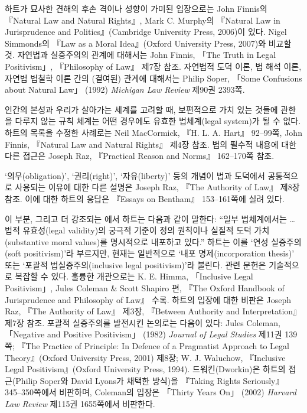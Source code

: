 {
하트가 묘사한 견해의 후손 격이나  성향이
가미된 입장으로는 John Finnis의 『Natural Law and Natural Rights』, Mark
C. Murphy의 『Natural Law in Jurisprudence and Politics』(Cambridge
University Press, 2006)이 있다. Nigel Simmonds의 『Law as a Moral
Idea』(Oxford University Press, 2007)와 비교할 것. 자연법과 실증주의의
관계에 대해서는 John Finnis, 「The Truth in Legal Positivism」,
『Philosophy of Law』 제7장 참조. 자연법적 도덕 이론, 법 해석 이론,
자연법 법철학 이론 간의 (결여된) 관계에 대해서는 Philip Soper, 「Some
Confusions about Natural Law」 (1992) \emph{Michigan Law Review} 제90권
2393쪽.

인간의 본성과 우리가 살아가는 세계를 고려할 때, 보편적으로 가치 있는
것들에 관한 을 다루지 않는 규칙
체계는 어떤 경우에도 유효한 법체계(legal system)가 될 수 없다. 하트의
목록을 수정한 사례로는 Neil MacCormick, 『H. L. A. Hart』 92--99쪽, John
Finnis, 『Natural Law and Natural Rights』 제4장 참조. 법의 필수적
내용에 대한 다른 접근은 Joseph Raz, 『Practical Reason and Norms』
162--170쪽 참조.

 `의무(obligation)', `권리(right)', `자유(liberty)' 등의
개념이 법과 도덕에서 공통적으로 사용되는 이유에 대한 다른 설명은 Joseph
Raz, 『The Authority of Law』 제8장 참조. 이에 대한 하트의 응답은
『Essays on Bentham』 153--161쪽에 실려 있다.

이 부분, 그리고 더 강조되는 에서 하트는 다음과
같이 말한다: ``일부 법체계에서는 \ldots{} 법적 유효성(legal validity)의
궁극적 기준이 정의 원칙이나 실질적 도덕 가치(substantive moral values)를
명시적으로 내포하고 있다.'' 하트는 이를 `연성 실증주의(soft
positivism)'라 부르지만, 현재는 일반적으로 `내포 명제(incorporation
thesis)' 또는 `포괄적 법실증주의(inclusive legal positivism)'라 불린다.
관련 문헌은 기술적으로 복잡할 수 있다. 훌륭한 개관으로는 K. E. Himma,
「Inclusive Legal Positivism」, Jules Coleman \& Scott Shapiro 편, 『The
Oxford Handbook of Jurisprudence and Philosophy of Law』 수록. 하트의
입장에 대한 비판은 Joseph Raz, 『The Authority of Law』 제3장, 『Between
Authority and Interpretation』 제7장 참조. 포괄적 실증주의를 발전시킨
논의로는 다음이 있다: Jules Coleman, 「Negative and Positive
Positivism」 (1982) \emph{Journal of Legal Studies} 제11권 139쪽; 『The
Practice of Principle: In Defence of a Pragmatist Approach to Legal
Theory』(Oxford University Press, 2001) 제8장; W. J. Waluchow,
『Inclusive Legal Positivism』(Oxford University Press, 1994).
드워킨(Dworkin)은 하트의 접근(Philip Soper와 David Lyons가 채택한
방식)을 『Taking Rights Seriously』 345--350쪽에서 비판하며, Coleman의
입장은 「Thirty Years On」 (2002) \emph{Harvard Law Review} 제115권
1655쪽에서 비판한다.

}
